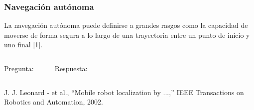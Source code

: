 \begin{frame}
    \frametitle{Navegación autónoma}
    \begin{block}{}
        La navegación autónoma puede definirse a grandes rasgos como la capacidad de moverse de forma segura a lo largo de una trayectoria entre un punto de inicio y uno final [1].
    \end{block}
    \vspace{5mm}
    \begin{columns}
        \hspace{13pt}Pregunta:
        \begin{enumerate}
        \end{enumerate}
        Respuesta:
        \begin{enumerate}[$\rightarrow$]
        \end{enumerate}
    \end{columns}
    \vfill
    \begin{tiny}
        [1] J. J. Leonard - et al., ``Mobile robot localization by ...,'' IEEE Transactions on Robotics and Automation, 2002.
    \end{tiny}
\end{frame}